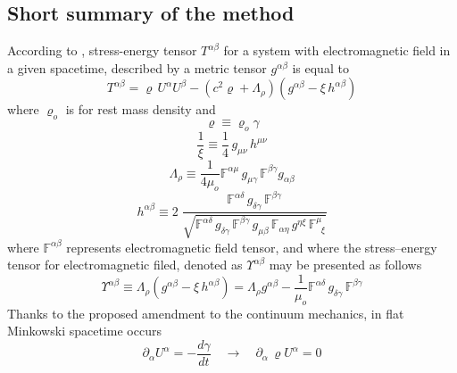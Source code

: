 \documentclass[aps,prx,preprint,groupedaddress,showkeys]{revtex4-2}
\newcommand{\mdt}[1] {\frac{d {#1}}{dt}}
\begin{document}
\subsection{Short summary of the method} \label{ShortSummary}

According to \cite{PMofC}, stress-energy tensor $T^{\alpha \beta}$ for a system with electromagnetic field in a given spacetime, described by a metric tensor $g^{\alpha \beta}$ is equal to
\begin{equation} \label{CH2}
T^{\alpha \beta} =  \varrho \, U^{\alpha} U^{\beta} - \left ( c^2 \varrho +  \Lambda_{\rho}  \right ) \left ( g^{\alpha \beta} - \xi \, h^{\alpha \beta} \right )
\end{equation}
where $\varrho_o$ is for rest mass density and
\begin{equation} \label{VRD}
\varrho \equiv \varrho_o \gamma
\end{equation}
\begin{equation} \label{CH4}
\frac{1}{\xi} \equiv \frac{1}{4}\, g_{\mu \nu} \, h^{\mu \nu}
\end{equation}
\begin{equation} \label{CH5}
\Lambda_{\rho} \equiv \frac{1}{4\mu_o} \mathbb{F}^{\alpha \mu} \, g_{\mu \gamma} \, \mathbb{F}^{ \beta \gamma } g_{\alpha \beta}
\end{equation}
\begin{equation} \label{CH6}
h^{\alpha \beta} \equiv 2 \; \frac{\mathbb{F}^{\alpha \delta} \, g_{\delta \gamma} \, \mathbb{F}^{ \beta \gamma } }{ \sqrt{\mathbb{F}^{\alpha \delta} \, g_{\delta \gamma} \, \mathbb{F}^{ \beta \gamma } \, g_{\mu \beta} \, \mathbb{F}_{\alpha \eta} \, g^{\eta \xi} \, \mathbb{F}^{\mu}_{\; \; \xi }}}
\end{equation}
where $\mathbb{F}^{\alpha \beta}$ represents electromagnetic field tensor, and where the stress–energy tensor for electromagnetic filed, denoted as $\Upsilon^{\alpha \beta}$ may be presented as follows
\begin{equation} \label{CH7}
\Upsilon^{\alpha \beta} \equiv  \Lambda_{\rho} \left (g^{\alpha \beta} - \xi \, h^{\alpha \beta}  \right ) = \Lambda_{\rho} g^{\alpha \beta} - \frac{1}{\mu_o}\mathbb{F}^{\alpha \delta} \, g_{\delta \gamma} \, \mathbb{F}^{ \beta \gamma }
\end{equation}
Thanks to the proposed amendment to the continuum mechanics, in flat Minkowski spacetime occurs
\begin{equation} \label{CH1}
\partial_{\alpha} U^{\alpha} = -\mdt{\gamma}  \quad \to \quad \partial_{\alpha} \, \varrho U^{\alpha} = 0
\end{equation}
\end{document}
